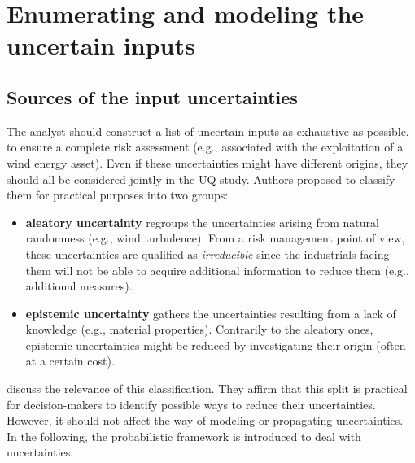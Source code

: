 \section{Enumerating and modeling the uncertain inputs} \label{sec:uq}

\subsection{Sources of the input uncertainties}

The analyst should construct a list of uncertain inputs as exhaustive as possible, to ensure a complete risk assessment (e.g., associated with the exploitation of a wind energy asset). 
Even if these uncertainties might have different origins, they should all be considered jointly in the UQ study. 
Authors proposed to classify them for practical purposes into two groups:
\begin{itemize}
    \item \textbf{aleatory uncertainty} regroups the uncertainties arising from natural randomness (e.g., wind turbulence). 
    From a risk management point of view, these uncertainties are qualified as \textit{irreducible} since the industrials facing them will not be able to acquire additional information to reduce them (e.g., additional measures).     
    \item \textbf{epistemic uncertainty} gathers the uncertainties resulting from a lack of knowledge (e.g., material properties). 
    Contrarily to the aleatory ones, epistemic uncertainties might be reduced by investigating their origin (often at a certain cost). 
\end{itemize} 

\citet{kiureghian_2009} discuss the relevance of this classification. 
They affirm that this split is practical for decision-makers to identify possible ways to reduce their uncertainties. 
However, it should not affect the way of modeling or propagating uncertainties. 
In the following, the probabilistic framework is introduced to deal with uncertainties. 


